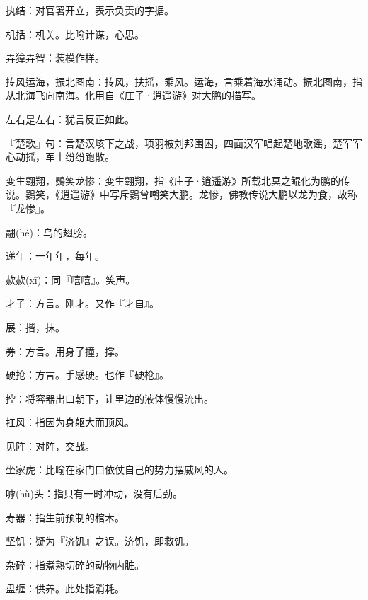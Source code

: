 \startbuffer[2047]
执结：对官署开立，表示负责的字据。
\stopbuffer


\startbuffer[2048]
机括：机关。比喻计谋，心思。
\stopbuffer


\startbuffer[2049]
弄獐弄智：装模作样。
\stopbuffer


\startbuffer[2050]
抟风运海，振北图南：抟风，扶摇，乘风。运海，言乘着海水涌动。振北图南，指从北海飞向南海。化用自《庄子·逍遥游》对大鹏的描写。
\stopbuffer


\startbuffer[2051]
左右是左右：犹言反正如此。
\stopbuffer


\startbuffer[2052]
『楚歌』句：言楚汉垓下之战，项羽被刘邦围困，四面汉军唱起楚地歌谣，楚军军心动摇，军士纷纷跑散。
\stopbuffer


\startbuffer[2053]
变生翱翔，鷃笑龙惨：变生翱翔，指《庄子·逍遥游》所载北冥之鲲化为鹏的传说。鷃笑，《逍遥游》中写斥鷃曾嘲笑大鹏。龙惨，佛教传说大鹏以龙为食，故称『龙惨』。
\stopbuffer


\startbuffer[2054]
翮(hé)：鸟的翅膀。
\stopbuffer


\startbuffer[2055]
递年：一年年，每年。
\stopbuffer


\startbuffer[2056]
赥赥(xī)：同『嘻嘻』。笑声。
\stopbuffer


\startbuffer[2057]
才子：方言。刚才。又作『才自』。
\stopbuffer


\startbuffer[2058]
展：揩，抹。
\stopbuffer


\startbuffer[2059]
券：方言。用身子撞，撑。
\stopbuffer


\startbuffer[2060]
硬抢：方言。手感硬。也作『硬枪』。
\stopbuffer


\startbuffer[2061]
控：将容器出口朝下，让里边的液体慢慢流出。
\stopbuffer


\startbuffer[2062]
扛风：指因为身躯大而顶风。
\stopbuffer


\startbuffer[2063]
见阵：对阵，交战。
\stopbuffer


\startbuffer[2064]
坐家虎：比喻在家门口依仗自己的势力摆威风的人。
\stopbuffer


\startbuffer[2065]
嘑(hù)头：指只有一时冲动，没有后劲。
\stopbuffer


\startbuffer[2066]
寿器：指生前预制的棺木。
\stopbuffer


\startbuffer[2067]
坚饥：疑为『济饥』之误。济饥，即救饥。
\stopbuffer


\startbuffer[2068]
杂碎：指煮熟切碎的动物内脏。
\stopbuffer


\startbuffer[2069]
盘缠：供养。此处指消耗。
\stopbuffer


